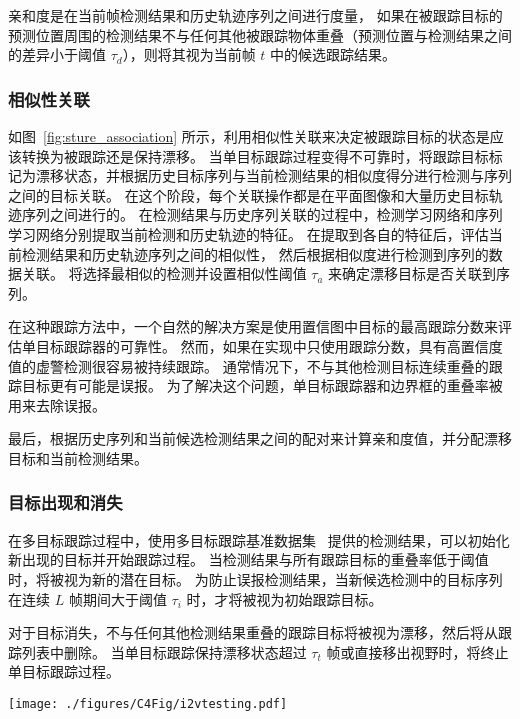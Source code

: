 亲和度是在当前帧检测结果和历史轨迹序列之间进行度量，
如果在被跟踪目标的预测位置周围的检测结果不与任何其他被跟踪物体重叠（预测位置与检测结果之间的差异小于阈值 $\tau _d $），则将其视为当前帧 $t$ 中的候选跟踪结果。


\subsubsection{相似性关联}
如图~\ref{fig:sture_association} 所示，利用相似性关联来决定被跟踪目标的状态是应该转换为被跟踪还是保持漂移。
当单目标跟踪过程变得不可靠时，将跟踪目标标记为漂移状态，并根据历史目标序列与当前检测结果的相似度得分进行检测与序列之间的目标关联。
在这个阶段，每个关联操作都是在平面图像和大量历史目标轨迹序列之间进行的。
在检测结果与历史序列关联的过程中，检测学习网络和序列学习网络分别提取当前检测和历史轨迹的特征。
在提取到各自的特征后，评估当前检测结果和历史轨迹序列之间的相似性，
然后根据相似度进行检测到序列的数据关联。
将选择最相似的检测并设置相似性阈值 $\tau_a$ 来确定漂移目标是否关联到序列。

在这种跟踪方法中，一个自然的解决方案是使用置信图中目标的最高跟踪分数来评估单目标跟踪器的可靠性。
然而，如果在实现中只使用跟踪分数，具有高置信度值的虚警检测很容易被持续跟踪。
通常情况下，不与其他检测目标连续重叠的跟踪目标更有可能是误报。
为了解决这个问题，单目标跟踪器和边界框的重叠率被用来去除误报。

最后，根据历史序列和当前候选检测结果之间的配对来计算亲和度值，并分配漂移目标和当前检测结果。


\subsubsection{目标出现和消失}
在多目标跟踪过程中，使用多目标跟踪基准数据集~\cite{RN583} 提供的检测结果，可以初始化新出现的目标并开始跟踪过程。
当检测结果与所有跟踪目标的重叠率低于阈值时，将被视为新的潜在目标。
为防止误报检测结果，当新候选检测中的目标序列在连续 $L$ 帧期间大于阈值 $\tau_i$ 时，才将被视为初始跟踪目标。

对于目标消失，不与任何其他检测结果重叠的跟踪目标将被视为漂移，然后将从跟踪列表中删除。
当单目标跟踪保持漂移状态超过 $\tau_t$ 帧或直接移出视野时，将终止单目标跟踪过程。


\vspace{0.5em}
\begin{figure*}[ht]
	\centering
	\texttt{[image: ./figures/C4Fig/i2vtesting.pdf]}
	\vspace{0.2em}
	\caption{当前检测结果和历史轨迹序列的数据关联流程}
	\label{fig:sture_association}
\end{figure*}




